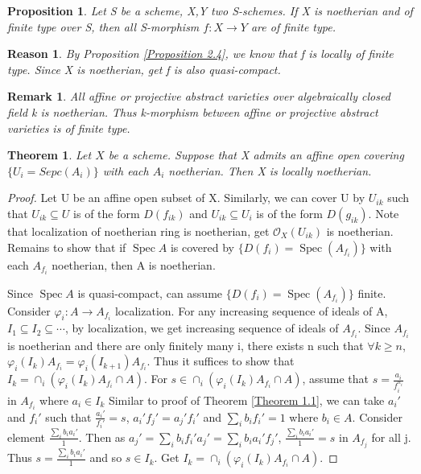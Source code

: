 \documentclass{ctexart}
\newtheorem{remark}{Remark}[section]
\newtheorem{theorem}{Theorem}[section]
\newtheorem{proposition}{Proposition}[section]
\newtheorem{reason}{Reason}[section]
\newcommand{\spec}{\operatorname{Spec}}
\begin{document}
\begin{proposition}
    Let S be a scheme, X,Y two S-schemes.
    If X is noetherian and of finite type over S,
    then all S-morphism $f: X \longrightarrow Y$ are of finite type.
    \label{Proposition 3.5}
\end{proposition}
\begin{reason}
    By Proposition \ref{Proposition 2.4}, we know that f is locally of finite type.
    Since X is noetherian, get f is also quasi-compact.
\end{reason}
\begin{remark}
    All affine or projective abstract varieties over algebraically closed field k is noetherian.
    Thus k-morphism between affine or projective abstract varieties is of finite type.
\end{remark}
\begin{theorem}
    Let $X$ be a scheme.
    Suppose that X admits an affine open covering $\{U_{i} = Sepc(A_{i})\}$ with each $A_{i}$ noetherian.
    Then X is locally noetherian.
    \label{Theorem 3.2}
\end{theorem}
\begin{proof}
    Let U be an affine open subset of X.
    Similarly, we can cover U by $U_{ik}$ such that $U_{ik} \subseteq U$ is of the form $D(f_{ik})$ and $U_{ik} \subseteq U_{i}$ is of the form $D(g_{ik})$.
    Note that localization of noetherian ring is noetherian, get $\mathcal{O}_{X}(U_{ik})$ is noetherian.
    Remains to show that if $\spec A$ is covered by $\{D(f_{i}) = \spec(A_{f_{i}})\}$ with each $A_{f_{i}}$ noetherian,
    then A is noetherian.
    \par
    Since $\spec A$ is quasi-compact, can assume $\{D(f_{i}) = \spec(A_{f_{i}})\}$ finite.
    Consider $\varphi_{i}: A \longrightarrow A_{f_{i}}$ localization.
    For any increasing sequence of ideals of A, $I_{1} \subseteq I_{2} \subseteq \cdots$, by localization, we get increasing sequence of ideals of $A_{f_{i}}$.
    Since $A_{f_{i}}$ is noetherian and there are only finitely many i, there exists n such that $\forall k \ge n$, $\varphi_{i}(I_{k})A_{f_{i}} = \varphi_{i}(I_{k + 1})A_{f_{i}}$.
    Thus it suffices to show that $I_{k} = \cap_{i} (\varphi_{i}(I_{k})A_{f_{i}} \cap A)$.
    For $s\in \cap_{i} (\varphi_{i}(I_{k})A_{f_{i}} \cap A)$, assume that $s = \frac{a_{i}}{f_{i}^{n_{i}}}$ in $A_{f_{i}}$ where $a_{i}\in I_{k}$
    Similar to proof of Theorem \ref{Theorem 1.1}, we can take $a_{i}'$ and $f_{i}'$ such that $\frac{a_{i}'}{f_{i}'} = s$, $a_{i}'f_{j}' = a_{j}'f_{i}'$ and $\sum_{i} b_{i}f_{i}' = 1$ where $b_{i}\in A$.
    Consider element $\frac{\sum_{i} b_{i}a_{i}'}{1}$.
    Then as $a_{j}' = \sum_{i} b_{i}f_{i}'a_{j}' = \sum_{i}b_{i}a_{i}'f_{j}'$, $\frac{\sum_{i} b_{i}a_{i}'}{1} = s$ in $A_{f_{j}}$ for all j.
    Thus $s = \frac{\sum_{i} b_{i}a_{i}'}{1}$ and so $s\in I_{k}$.
    Get $I_{k} = \cap_{i} (\varphi_{i}(I_{k})A_{f_{i}} \cap A)$.
\end{proof}
\end{document}
